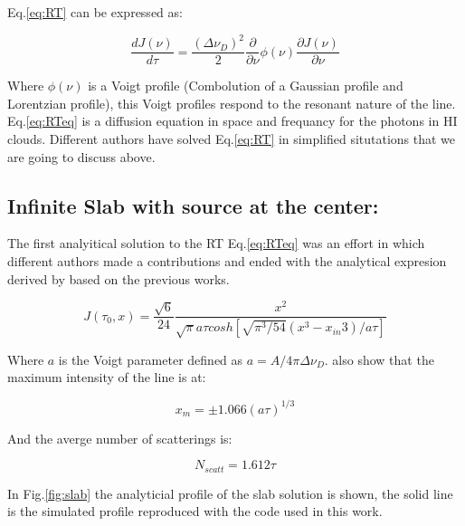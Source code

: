 Eq.\ref{eq:RT} can be expressed as: 

\begin{equation}\label{eq:RTeq}
\dfrac{dJ(\nu)}{d\tau} = \dfrac{(\Delta \nu_D)^2}{2}\dfrac{\partial}{\partial \nu}\phi(\nu)\dfrac{\partial J(\nu)}{\partial \nu}
\end{equation}

Where $\phi(\nu)$ is a Voigt profile (Combolution of a Gaussian profile  
and Lorentzian profile), this Voigt profiles respond to the resonant nature 
of the line. Eq.\ref{eq:RTeq} is a diffusion equation in space and frequancy
for the \ly photons in HI clouds. Different authors have solved 
Eq.\ref{eq:RT} in simplified situtations that we are going to discuss above. 

\subsection{Infinite Slab with \ly source at the center:}

The first analyitical solution to the RT Eq.\ref{eq:RTeq}
was an effort in which different authors made a contributions \citep{Unno55, Osterbrock62, Adams72, Harrington73} and ended with the analytical expresion
derived by \citep{eufeld90} based on the previous works. 

\begin{equation}
J(\tau_0, x) = \dfrac{\sqrt{6}}{24}\dfrac{x^2}{\sqrt{\pi}a\tau cosh[\sqrt{\pi^3/54}(x^3-x_{in}3)/a\tau]}
\end{equation}

Where $a$ is the Voigt parameter defined as $a=A/4\pi\Delta \nu_D$. \citep{Harrington73} also show that the maximum intensity of the line is at:

\begin{equation}
x_m = \pm1.066(a\tau)^{1/3}
\end{equation}

And the averge number of scatterings is:

\begin{equation}
N_{scatt} = 1.612\tau
\end{equation}

In Fig.\ref{fig:slab} the analyticial profile of the slab solution is shown, 
the solid line is the simulated profile reproduced with \citep{CLARA} the code
used in this work.

